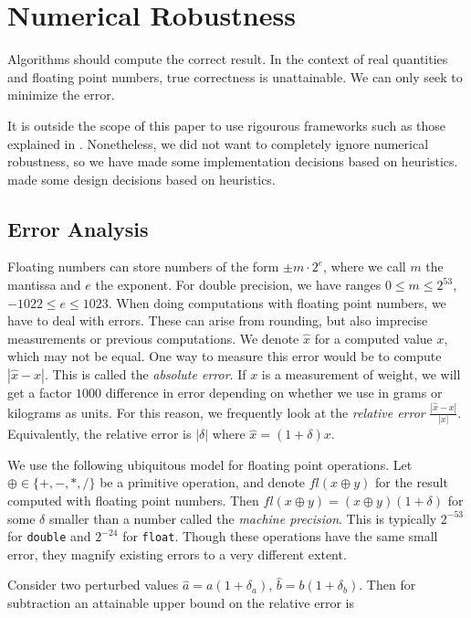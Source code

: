 \section{Numerical Robustness}

Algorithms should compute the correct result. In the context of real quantities
and floating point numbers, true correctness is unattainable. We can only
seek to minimize the error. 

It is outside the scope of this paper to use rigourous frameworks such as those 
explained in \cite{Higham02, Jiang06}.
Nonetheless, we did not want to completely ignore numerical robustness, so we 
have made some implementation decisions based on heuristics.
made some design decisions based on heuristics.

\subsection{Error Analysis}

Floating numbers can store numbers of the form $\pm m \cdot 2^e$,
where we call $m$ the mantissa and $e$ the exponent. For double precision,
we have ranges $0 \leq m \leq 2^{53}$, $-1022 \leq e \leq 1023$.
When doing computations with floating point numbers, we have to deal with
errors. These can arise from rounding, but also imprecise measurements or
previous computations. We denote $\hat{x}$ for a computed value $x$, which
may not be equal. One way to measure this error would be to compute
$|\hat{x} - x|$. This is called the \textit{absolute error}. If $x$ is a
measurement of weight, we will get a factor $1000$ difference in error
depending on whether we use in grams or kilograms as units. For this reason,
we frequently look at the \textit{relative error} $\frac{|\hat{x} - x|}{|x|}$.
Equivalently, the relative error is $|\delta|$ where $\hat{x} = (1 + \delta)x$.

We use the following ubiquitous model for floating point operations. Let
$\oplus \in \{+, -, *, /\}$ be a primitive operation, and denote 
$fl(x \oplus y)$ for the result computed with floating point numbers. Then
$fl(x \oplus y) = (x \oplus y)(1 + \delta)$ for some $\delta$ smaller than
a number called the \textit{machine precision}. This is typically $2^{-53}$
for \texttt{double} and $2^{-24}$ for \texttt{float}. Though these operations
have the same small error, they magnify existing errors to a very different
extent.

Consider two perturbed values $\hat{a} = a(1 + \delta_a)$,
$\hat{b} = b(1 + \delta_b)$. Then for subtraction an attainable
upper bound on the relative error is


